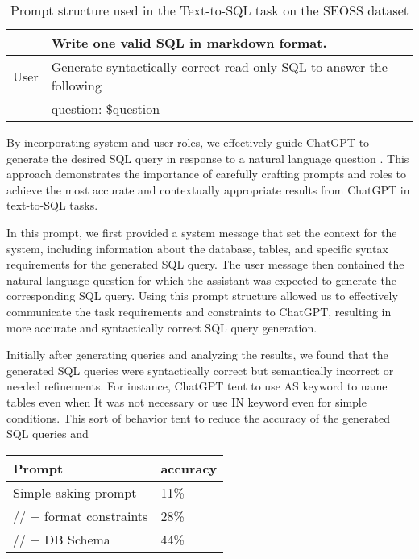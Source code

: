 \begin{table}[h]
\begin{tabular}{|l|l|}
                      & Write one valid SQL in markdown format.                                                      \\ \hline
        User          & Generate syntactically correct read-only SQL to answer the following                         \\
                      & question: \$question                                                                         \\ \hline
    \end{tabular}
    \caption{Prompt structure used in the Text-to-SQL task on the SEOSS dataset}
\end{table}

By incorporating system and user roles, we effectively guide ChatGPT to generate the desired SQL query in response to a natural language question \cite{white2023prompt}. This approach demonstrates the importance of carefully crafting prompts and roles to achieve the most accurate and contextually appropriate results from ChatGPT in text-to-SQL tasks.

In this prompt, we first provided a system message that set the context for the system, including information about the database, tables, and specific syntax requirements for the generated SQL query. The user message then contained the natural language question for which the assistant was expected to generate the corresponding SQL query.
Using this prompt structure allowed us to effectively communicate the task requirements and constraints to ChatGPT, resulting in more accurate and syntactically correct SQL query generation.

Initially after generating queries and analyzing the results, we found that the generated SQL queries were syntactically correct but semantically incorrect or needed refinements. For instance, ChatGPT tent to use AS keyword to name tables even when It was not necessary or use IN keyword even for simple conditions. This sort of behavior tent to reduce the accuracy of the generated SQL queries and

\begin{table}[h]
    \centering
    \begin{tabular}{|l|l|}
        \hline
        \textbf{Prompt}         & \textbf{accuracy} \\ \hline
        Simple asking prompt    & 11\%              \\ \hline
        // + format constraints & 28\%              \\ \hline
        //  + DB Schema         & 44\%              \\ \hline
    \end{tabular}
\end{table}


